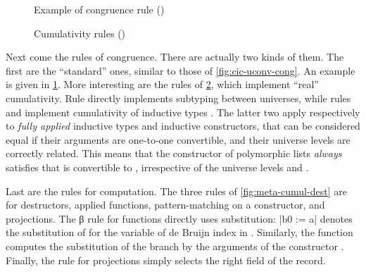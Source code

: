 \begin{figure}[ht]
  \ContinuedFloat
  \caption{Example of congruence rule ()}
  \label{fig:meta-cumul-cong}
\end{figure}

\begin{figure}[h]
  \ContinuedFloat
  \caption{Cumulativity rules ()}
  \label{fig:meta-cumul-cumul}
\end{figure}

Next come the rules of congruence. There are actually two kinds of them. The first are the
“standard” ones, similar to those of \cref{fig:cic-uconv-cong}. An example
is given in \cref{fig:meta-cumul-cong}.
More interesting are the rules of
\cref{fig:meta-cumul-cumul}, which implement “real” cumulativity. Rule  directly
implements subtyping between universes, while rules  and 
implement cumulativity of inductive types . The latter two apply respectively
to \emph{fully applied} inductive types and inductive constructors, that can be considered equal
if their arguments are one-to-one convertible, and their universe levels are correctly related.
This means that \eg the  constructor of polymorphic lists \emph{always} satisfies that
 is convertible to , irrespective of the universe levels 
and .

\begin{figure*}
  \ContinuedFloat
  \caption{Computation rules for destructors ()}
  \label{fig:meta-cumul-dest}
\end{figure*}

Last are the rules for computation.
The three rules of \cref{fig:meta-cumul-dest} are for destructors, \ie applied functions,
pattern-matching on a constructor, and projections. The β rule for functions directly uses
substitution: \coqe|b{0 := a}| denotes the substitution of  for the variable of de Bruijn
index  in . Similarly, the
 function computes the substitution of the branch  by the arguments
of the constructor .
Finally, the rule for projections simply selects the right field of the record.

